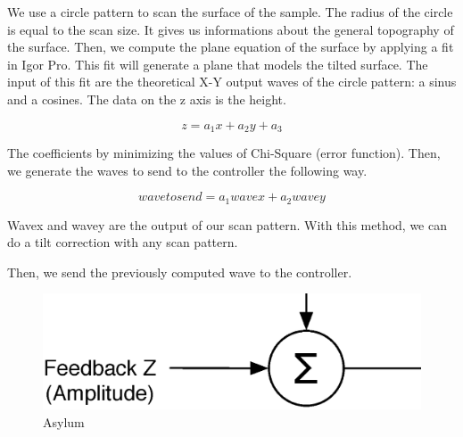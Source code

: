 We use a circle pattern to scan the surface of the sample. The radius of the circle is equal to the scan size. It gives us informations about the general topography of the surface. Then, we compute the plane equation of the surface by applying a fit in Igor Pro. This fit will generate a plane that models the tilted surface. The input of this fit are the theoretical X-Y output waves of the circle pattern: a sinus and a cosines. The data on the z axis is the height.

\begin{equation}\label{eqn:planeeq}
z = a_1 x + a_2 y + a_3 
\end{equation}

The coefficients by minimizing the values of Chi-Square (error function). Then, we generate the waves to send to the controller the following way.

\begin{equation}\label{eqn:sendwave}
wavetosend = a_1 wavex + a_2 wavey 
\end{equation}

Wavex and wavey are the output of our scan pattern. With this method, we can do a tilt correction with any scan pattern.

Then, we send the previously computed wave to the controller.

\begin{figure}[H]
  \centering
  \includegraphics[scale=0.4]{images/outputz.eps}
    \caption{Asylum}
  \label{outputz}
\end{figure}